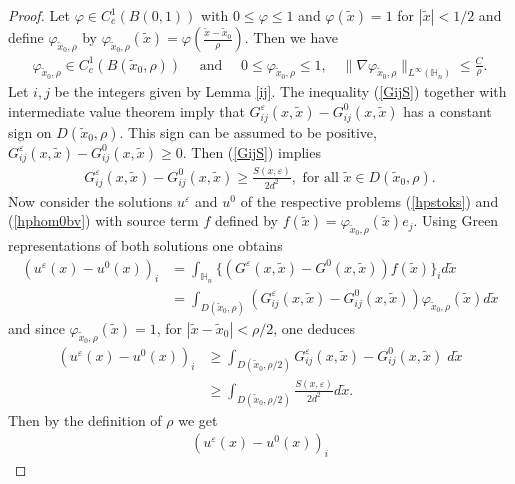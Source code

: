 \documentclass[11pt, reqno]{amsart}
\theoremstyle{definition}
\theoremstyle{remark}
\numberwithin{equation}{section}
\begin{document}
\begin{proof}[Proof]
			 Let $\varphi\in C^1_c (B(0,1))	$ with $0\leq \varphi \leq 1$ and $\varphi(\tilde{x})=1$ for $|\tilde{x}|< 1/2$ and define $\varphi_{\tilde{x}_0, \rho}$ by $\varphi_{\tilde{x}_0, \rho} (\tilde{x})=\varphi(\frac{\tilde{x} - \tilde{x}_0}{\rho})$. Then we have 
			\begin{align}
				\varphi_{\tilde{x}_0, \rho}\in C^1_c (B(\tilde{x}_0,\rho))\quad \mbox{ and }	\quad  0 \leq \varphi_{\tilde{x}_0, \rho}\leq 1,\quad \| \nabla \varphi_{\tilde{x}_0, \rho}\|_{L^\infty(\mathbb{H}_n)} \leq \frac{C}{\rho} . \label{bound_phi}
			\end{align}
			Let $i,j$ be the integers given by Lemma \ref{ij}. The inequality (\ref{GijS}) together with intermediate value theorem imply that  $ G_{ij}^\varepsilon(x,\tilde{x})- G_{ij}^0(x,\tilde{x})$ has a constant sign on $D(\tilde{x}_0, \rho)$. This sign can be assumed to be positive, $ G_{ij}^\varepsilon(x,\tilde{x})- G_{ij}^0(x,\tilde{x})\geq 0$. Then (\ref{GijS}) implies
			\begin{align}
				G_{ij}^\varepsilon(x,\tilde{x})- G_{ij}^0(x,\tilde{x})\geq \frac{S(x,\varepsilon)}{2d^2} ,  \mbox{ for all  } \tilde{x} \in  D(\tilde{x}_0,\rho).
			\end{align}
			Now consider the solutions $u^\varepsilon$ and $u^0$ of the respective problems (\ref{hpstoks}) and (\ref{hphom0bv}) with source term $f$ defined by $f(\tilde{x})= \varphi_{\tilde{x}_0, \rho} (\tilde{x}) e_j$. Using Green representations of both solutions one obtains 
			\begin{align*}
				(u^\varepsilon (x) -u^0(x))_i &= \int_{\mathbb{H}_n} \{(G^\varepsilon(x,\tilde{x})- G^0(x,\tilde{x}) ) f(\tilde{x}) \}_i  d\tilde{x}\\
				&= \int_{D(\tilde{x}_0,\rho)} (G_{ij}^\varepsilon(x,\tilde{x})- G_{ij}^0(x,\tilde{x}))\varphi_{\tilde{x}_0, \rho} (\tilde{x})  d\tilde{x}
			\end{align*}
			and since $\varphi_{\tilde{x}_0, \rho}(\tilde{x})=1$, for $|\tilde{x}- \tilde{x}_0 | < \rho /2 $, one deduces
			\begin{align*}
				(u^\varepsilon (x) -u^0(x))_i 
				&\geq \int_{D(\tilde{x}_0,\rho/2)} G_{ij}^\varepsilon(x,\tilde{x})- G_{ij}^0(x,\tilde{x}) \;  d\tilde{x}\\
				&\geq  \int_{D(\tilde{x}_0,\rho/2)}  \frac{S(x,\varepsilon)}{2d^2} d\tilde{x}.
			\end{align*}
			Then by the definition of $\rho$	we get
			\begin{align*}
				(u^\varepsilon (x) -u^0(x))_i 

\end{align*}
\end{proof}
\end{document}
